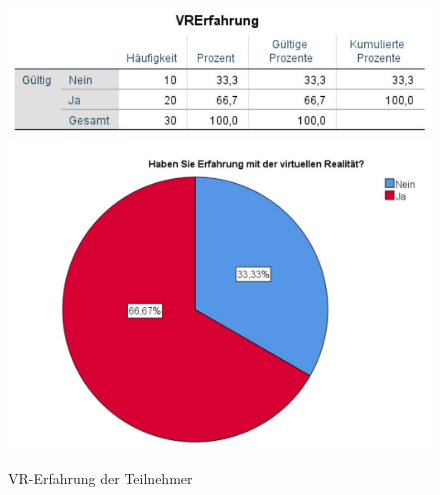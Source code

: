 \documentclass[a4paper,11pt]{article}%
\renewcommand{\\}{\vspace*{0.5\baselineskip} \newline}
\begin{document}
	\begin{figure}[H]
	\centering
		\begin{footnotesize}
			\includegraphics[scale=0.6]{Abbildungen/Pre_QuestionnaireStatistiks/teilnehmerVRErfahrung}\\
			\includegraphics[scale=0.5]{Abbildungen/Demographie/teilnehmerVRErfahrung}\\
			\caption{VR-Erfahrung der Teilnehmer}
			\label{fig:teilnehmerVRErfahrung}
		\end{footnotesize}
	\end{figure}	
	
\end{document}
